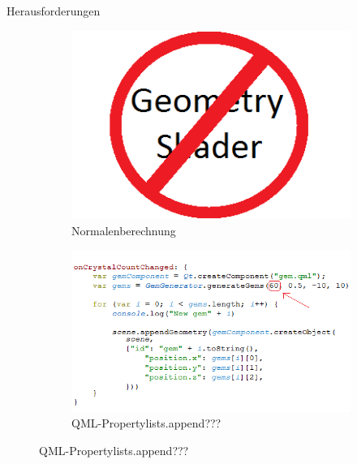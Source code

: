 \slideonetoone
{Herausforderungen}
{	
	\begin{figure}
		\centering
		\begin{subfigure}{\textwidth}
			\centering
			\includegraphics[width=\textwidth, height=0.3\textheight, keepaspectratio]{images/nogeometry}
			\caption{Normalenberechnung}
		\end{subfigure}
		\begin{subfigure}{\textwidth}
			\centering
			\includegraphics[width=\textwidth, height=0.3\textheight, keepaspectratio]{images/60max}
			\caption{QML-Propertylists.append???}
		\end{subfigure}
	\end{figure}
}
